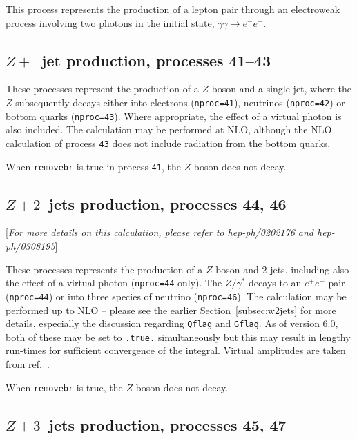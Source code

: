 \documentclass{article}
\begin{document}
This process represents the production of a lepton pair through an electroweak
process involving two photons in the initial state, $\gamma\gamma \to e^- e^+$.


\subsection{$Z+$~jet production, processes 41--43}
\label{subsec:zjet}

These processes represent the production of a $Z$ boson and a single jet,
where the $Z$ subsequently
decays either into electrons ({\tt nproc=41}), neutrinos ({\tt nproc=42})
or bottom quarks ({\tt nproc=43}). Where appropriate, the effect of a virtual
photon is also included. The calculation may be performed at NLO,
although the NLO calculation of process {\tt 43} does not include radiation
from the bottom quarks.

When {\tt removebr} is true in process {\tt 41}, the $Z$ boson does not decay.

\subsection{$Z+2$~jets production, processes 44, 46}
\label{subsec:z2jets}

\begin{center}
[{\it For more details on this calculation, please refer to \break
 hep-ph/0202176 and hep-ph/0308195}]
\end{center}

These processes represents the production of a $Z$ boson and $2$ jets,
including also the effect of a virtual photon ({\tt nproc=44} only). The $Z/\gamma^*$ decays
to an $e^+ e^-$ pair ({\tt nproc=44}) or into three species of neutrino ({\tt nproc=46}).
The calculation may be performed up to NLO --
please see the earlier Section~\ref{subsec:w2jets} for more details,
especially the discussion regarding {\tt Qflag} and {\tt Gflag}.
As of version 6.0, both of these may be set to {\tt .true.} simultaneously but this
may result in lengthy run-times for sufficient convergence of the integral.
Virtual amplitudes are taken from ref.~\cite{Bern:1997sc}.

When {\tt removebr} is true, the $Z$ boson does not decay.


\subsection{$Z+3$~jets production, processes 45, 47}
\label{subsec:z3jets}
\end{document}
